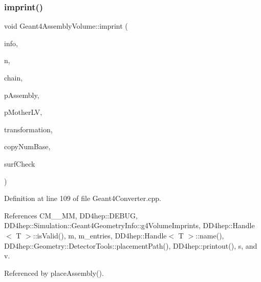 \subsubsection{\texorpdfstring{imprint()}{imprint()}}
{\footnotesize\ttfamily void Geant4\+Assembly\+Volume\+::imprint (\begin{DoxyParamCaption}\item[{\hyperlink{class_d_d4hep_1_1_simulation_1_1_geant4_geometry_info}{Geant4\+Geometry\+Info} \&}]{info,  }\item[{const T\+Geo\+Node $\ast$}]{n,  }\item[{\hyperlink{class_d_d4hep_1_1_simulation_1_1_geant4_assembly_volume_ad79481b292635c219fcc03d160689211}{Chain}}]{chain,  }\item[{\hyperlink{class_d_d4hep_1_1_simulation_1_1_geant4_assembly_volume}{Geant4\+Assembly\+Volume} $\ast$}]{p\+Assembly,  }\item[{G4\+Logical\+Volume $\ast$}]{p\+Mother\+LV,  }\item[{G4\+Transform3D \&}]{transformation,  }\item[{G4int}]{copy\+Num\+Base,  }\item[{G4bool}]{surf\+Check }\end{DoxyParamCaption})}



Definition at line 109 of file Geant4\+Converter.\+cpp.



References C\+M\+\_\+\_\+\+MM, D\+D4hep\+::\+D\+E\+B\+UG, D\+D4hep\+::\+Simulation\+::\+Geant4\+Geometry\+Info\+::g4\+Volume\+Imprints, D\+D4hep\+::\+Handle$<$ T $>$\+::is\+Valid(), m, m\+\_\+entries, D\+D4hep\+::\+Handle$<$ T $>$\+::name(), D\+D4hep\+::\+Geometry\+::\+Detector\+Tools\+::placement\+Path(), D\+D4hep\+::printout(), s, and v.



Referenced by place\+Assembly().

\hypertarget{class_d_d4hep_1_1_simulation_1_1_geant4_assembly_volume_adde18f645695f14e3ae08d7fed2451c1}{}\label{class_d_d4hep_1_1_simulation_1_1_geant4_assembly_volume_adde18f645695f14e3ae08d7fed2451c1} 
